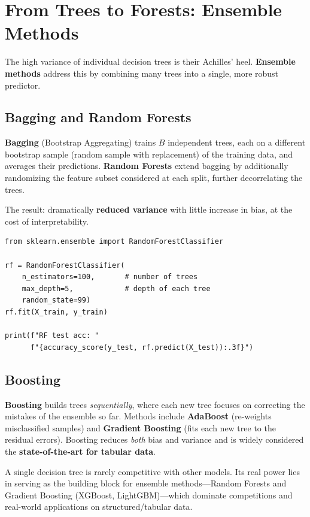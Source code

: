 \section*{From Trees to Forests: Ensemble Methods}

The high variance of individual decision trees is their Achilles' heel. \textbf{Ensemble methods} address this by combining many trees into a single, more robust predictor.

\subsection*{Bagging and Random Forests}

\textbf{Bagging} (Bootstrap Aggregating) trains $B$ independent trees, each on a different bootstrap sample (random sample with replacement) of the training data, and averages their predictions. \textbf{Random Forests} extend bagging by additionally randomizing the feature subset considered at each split, further decorrelating the trees.

The result: dramatically \textbf{reduced variance} with little increase in bias, at the cost of interpretability.

\begin{lstlisting}[style=pythonstyle]
from sklearn.ensemble import RandomForestClassifier

rf = RandomForestClassifier(
    n_estimators=100,       # number of trees
    max_depth=5,            # depth of each tree
    random_state=99)
rf.fit(X_train, y_train)

print(f"RF test acc: "
      f"{accuracy_score(y_test, rf.predict(X_test)):.3f}")
\end{lstlisting}

\subsection*{Boosting}

\textbf{Boosting} builds trees \textit{sequentially}, where each new tree focuses on correcting the mistakes of the ensemble so far. Methods include \textbf{AdaBoost} (re-weights misclassified samples) and \textbf{Gradient Boosting} (fits each new tree to the residual errors). Boosting reduces \textit{both} bias and variance and is widely considered the \textbf{state-of-the-art for tabular data}.

\begin{remark}
A single decision tree is rarely competitive with other models. Its real power lies in serving as the building block for ensemble methods---Random Forests and Gradient Boosting (XGBoost, LightGBM)---which dominate competitions and real-world applications on structured/tabular data.
\end{remark}

